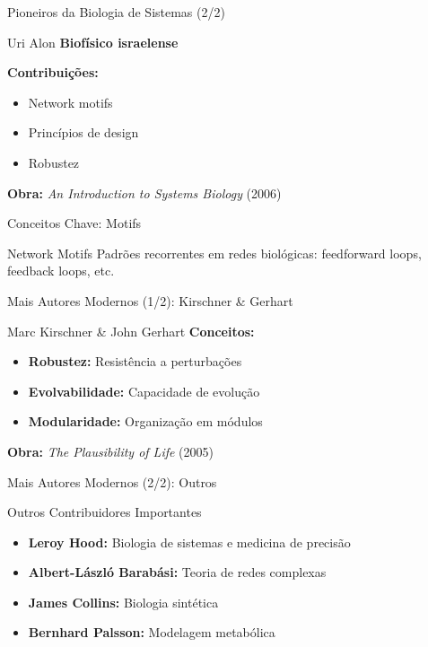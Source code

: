 \begin{frame}{Pioneiros da Biologia de Sistemas (2/2)}
\begin{block}{Uri Alon}
\textbf{Biofísico israelense}

\vspace{0.2cm}

\textbf{Contribuições:}
\begin{itemize}
    \item Network motifs
    \item Princípios de design
    \item Robustez
\end{itemize}

\vspace{0.2cm}
\textbf{Obra:} \textit{An Introduction to Systems Biology} (2006)
\end{block}
\end{frame}

\begin{frame}{Conceitos Chave: Motifs}
\begin{exampleblock}{Network Motifs}
Padrões recorrentes em redes biológicas: feedforward loops, feedback loops, etc.
\end{exampleblock}
\end{frame}

\begin{frame}{Mais Autores Modernos (1/2): Kirschner \& Gerhart}
\begin{block}{Marc Kirschner \& John Gerhart}
\textbf{Conceitos:}
\begin{itemize}
    \item \textbf{Robustez:} Resistência a perturbações
    \item \textbf{Evolvabilidade:} Capacidade de evolução
    \item \textbf{Modularidade:} Organização em módulos
\end{itemize}

\vspace{0.2cm}

\textbf{Obra:} \textit{The Plausibility of Life} (2005)
\end{block}
\end{frame}

\begin{frame}{Mais Autores Modernos (2/2): Outros}
\begin{block}{Outros Contribuidores Importantes}
\begin{itemize}
    \item \textbf{Leroy Hood:} Biologia de sistemas e medicina de precisão
    \item \textbf{Albert-László Barabási:} Teoria de redes complexas
    \item \textbf{James Collins:} Biologia sintética
    \item \textbf{Bernhard Palsson:} Modelagem metabólica
\end{itemize}
\end{block}
\end{frame}

